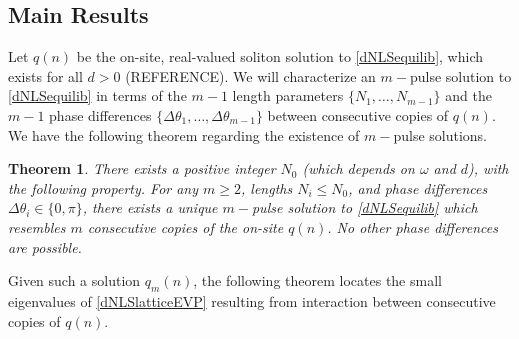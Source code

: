 \documentclass[12pt]{article}
\newtheorem{theorem}{Theorem}
\begin{document}
\subsection{Main Results}

Let $q(n)$ be the on-site, real-valued soliton solution to \eqref{dNLSequilib}, which exists for all $d > 0$ (REFERENCE). We will characterize an $m-$pulse solution to \eqref{dNLSequilib} in terms of the $m-1$ length parameters $\{ N_1, \dots, N_{m-1} \}$ and the $m-1$ phase differences $\{ \Delta\theta_1, \dots, \Delta\theta_{m-1} \}$ between consecutive copies of $q(n)$. We have the following theorem regarding the existence of $m-$pulse solutions.

\begin{theorem}\label{dNLSexisttheorem}
There exists a positive integer $N_0$ (which depends on $\omega$ and $d$), with the following property. For any $m \geq 2$, lengths $N_i \leq N_0$, and phase differences $\Delta\theta_i \in \{0, \pi\}$, there exists a unique $m-$pulse solution to \eqref{dNLSequilib} which resembles $m$ consecutive copies of the on-site $q(n)$. No other phase differences are possible.
\end{theorem}

Given such a solution $q_m(n)$, the following theorem locates the small eigenvalues of \eqref{dNLSlatticeEVP} resulting from interaction between consecutive copies of $q(n)$. 
\end{document}
